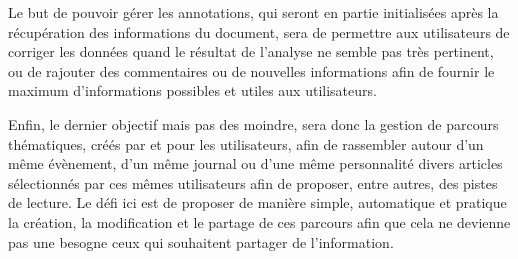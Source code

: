     Le but de pouvoir gérer les annotations, qui seront en partie initialisées après la récupération
    des informations du document, sera de permettre aux utilisateurs de corriger les données quand
    le résultat de l’analyse ne semble pas très pertinent, ou de rajouter des commentaires ou
    de nouvelles informations afin de fournir le maximum d’informations possibles et utiles aux utilisateurs.

    Enfin, le dernier objectif mais pas des moindre, sera donc la gestion de parcours thématiques,
    créés par et pour les utilisateurs, afin de rassembler autour d’un même évènement,
    d’un même journal ou d’une même personnalité divers articles sélectionnés par ces mêmes utilisateurs
    afin de proposer, entre autres, des pistes de lecture. Le défi ici est de proposer de manière simple,
    automatique et pratique la création, la modification et le partage de ces parcours afin que cela
    ne devienne pas une besogne ceux qui souhaitent partager de l’information.
